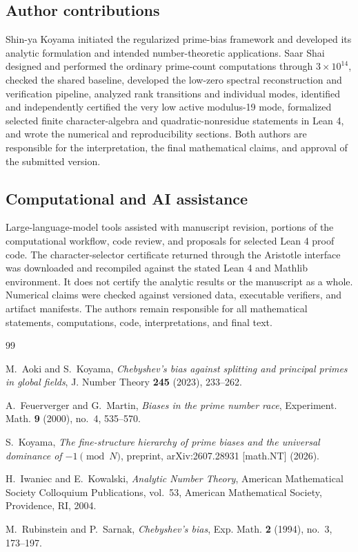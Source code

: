 \documentclass[12pt,reqno]{amsart}
\theoremstyle{definition}
\theoremstyle{remark}
\numberwithin{equation}{section}
\begin{document}
\subsection{Author contributions}

Shin-ya Koyama initiated the regularized prime-bias framework and developed
its analytic formulation and intended number-theoretic applications.  Saar
Shai designed and performed the ordinary prime-count computations through
$3\times10^{14}$, checked the shared baseline, developed the low-zero spectral
reconstruction and verification pipeline, analyzed rank transitions and
individual modes, identified and independently certified the very low active
modulus-19 mode, formalized selected finite character-algebra and
quadratic-nonresidue statements in Lean 4, and wrote the numerical and
reproducibility sections.  Both authors are responsible for the interpretation,
the final mathematical claims, and approval of the submitted version.

\subsection{Computational and AI assistance}

Large-language-model tools assisted with manuscript revision, portions of the
computational workflow, code review, and proposals for selected Lean 4 proof
code.  The character-selector certificate returned through the Aristotle
interface was downloaded and recompiled against the stated Lean 4 and Mathlib
environment.  It does not certify the analytic results or the manuscript as a
whole.  Numerical claims were checked against versioned data, executable
verifiers, and artifact manifests.  The authors remain responsible for all
mathematical statements, computations, code, interpretations, and final text.

\begin{thebibliography}{99}

M.~Aoki and S.~Koyama,
\textit{ Chebyshev's bias against splitting and principal primes in global ﬁelds},
J. Number Theory \textbf{245} (2023), 233–262.

A.~Feuerverger and G.~Martin,
\textit{Biases in the prime number race},
Experiment. Math. \textbf{9} (2000), no.~4, 535--570.

S.~Koyama,
\textit{The fine-structure hierarchy of prime biases and the universal
dominance of $-1 \pmod N$},
preprint, arXiv:2607.28931 [math.NT] (2026).

H.~Iwaniec and E.~Kowalski,
\textit{Analytic Number Theory},
American Mathematical Society Colloquium Publications, vol.~53, American Mathematical Society, Providence, RI, 2004.

M.~Rubinstein and P.~Sarnak,
\textit{Chebyshev's bias},
Exp. Math. \textbf{2} (1994), no.~3, 173--197.

\end{thebibliography}
\end{document}
